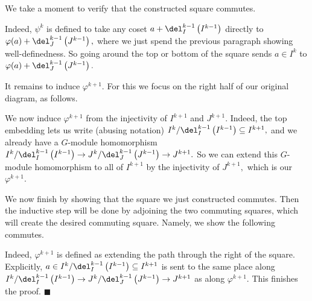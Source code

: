We take a moment to verify that the constructed square commutes.
\begin{center}
\end{center}
Indeed, $\psi^k$ is defined to take any coset $a+\del_I^{k-1}\left(I^{k-1}\right)$ directly to $\varphi(a)+\del_J^{k-1}\left(J^{k-1}\right),$ where we just spend the previous paragraph showing well-definedness. So going around the top or bottom of the square sends $a\in I^k$ to $\varphi(a)+\del_J^{k-1}\left(J^{k-1}\right).$

It remains to induce $\varphi^{k+1}.$ For this we focus on the right half of our original diagram, as follows.
\begin{center}
\end{center}
We now induce $\varphi^{k+1}$ from the injectivity of $I^{k+1}$ and $J^{k+1}.$ Indeed, the top embedding lets us write (abusing notation) $I^k/\del_I^{k-1}\left(I^{k-1}\right)\subseteq I^{k+1},$ and we already have a $G$-module homomorphism $I^k/\del_I^{k-1}\left(I^{k-1}\right)\to J^k/\del_J^{k-1}\left(J^{k-1}\right)\to J^{k+1}.$ So we can extend this $G$-module homomorphism to all of $I^{k+1}$ by the injectivity of $J^{k+1},$ which is our $\varphi^{k+1}.$

We now finish by showing that the square we just constructed commutes. Then the inductive step will be done by adjoining the two commuting squares, which will create the desired commuting square. Namely, we show the following commutes.
\begin{center}
\end{center}
Indeed, $\varphi^{k+1}$ is defined as extending the path through the right of the square. Explicitly, $a\in I^k/\del_I^{k-1}\left(I^{k-1}\right)\subseteq I^{k+1}$ is sent to the same place along $I^k/\del_I^{k-1}\left(I^{k-1}\right)\to J^k/\del_J^{k-1}\left(J^{k-1}\right)\to J^{k+1}$ as along $\varphi^{k+1}.$ This finishes the proof. $\blacksquare$

